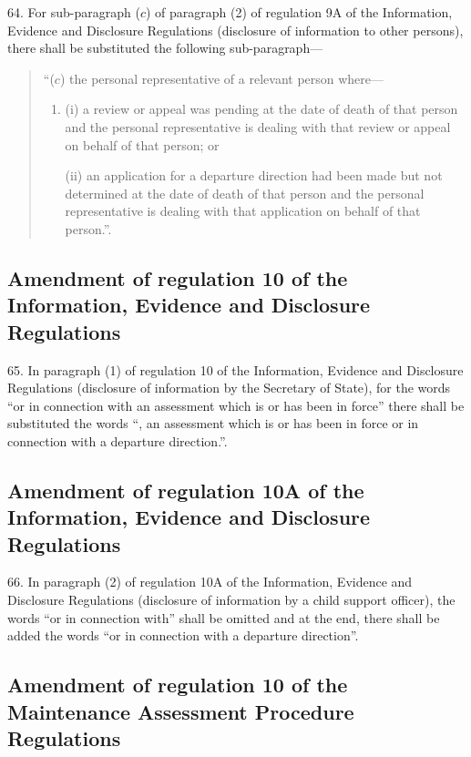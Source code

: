 \documentclass[a4paper]{article}
\begin{document}
64. For sub-paragraph ($c$) of paragraph (2) of regulation 9A of the
Information, Evidence and Disclosure Regulations (disclosure of information to
other persons), there shall be substituted the following sub-paragraph—
\begin{quotation}
“($c$) the personal representative of a relevant person where—
\begin{enumerate}\item[]
(i) a review or appeal was pending at the date of death of that person and the
personal representative is dealing with that review or appeal on behalf of that
person; or

(ii) an application for a departure direction had been made but not determined at
the date of death of that person and the personal representative is dealing with
that application on behalf of that person.”.
\end{enumerate}
\end{quotation}

\subsection[65. Amendment of regulation 10 of the Information, Evidence and Disclosure
Regulations]{Amendment of regulation 10 of the Information, Evidence and Disclosure
Regulations}

65. In paragraph (1) of regulation 10 of the Information, Evidence
and Disclosure Regulations (disclosure of information by the Secretary of
State), for the words “or in connection with an assessment which is or has been
in force” there shall be substituted the words “, an assessment which is or has
been in force or in connection with a departure direction.”.

\subsection[66. Amendment of regulation 10A of the Information, Evidence and Disclosure
Regulations]{Amendment of regulation 10A of the Information, Evidence and Disclosure
Regulations}

66. In paragraph (2) of regulation 10A of the Information, Evidence
and Disclosure Regulations (disclosure of information by a child support
officer), the words “or in connection with” shall be omitted and at the end,
there shall be added the words “or in connection with a departure direction”.

\subsection[67. Amendment of regulation 10 of the Maintenance Assessment Procedure
Regulations]{Amendment of regulation 10 of the Maintenance Assessment Procedure
Regulations}
\end{document}
